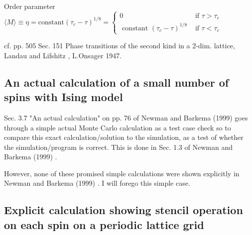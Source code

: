 \documentclass[10pt]{amsart}
\begin{document}
\begin{multicols*}{2}
Order parameter $\langle M \rangle \equiv \eta = \text{constant}(\tau_c - \tau)^{1/8} = \begin{cases} 0 & \text{ if } \tau > \tau_c \\ 
\text{ constant } (\tau_c-\tau)^{1/8} & \text{ if } \tau < \tau_c \end{cases}$  

cf. pp. 505 Sec. 151 Phase transitions of the second kind in a 2-dim. lattice,  Landau and Lifshitz \cite{LaLi1980}, L.Onsager 1947.  

\subsection{An actual calculation of a small number of spins with Ising model}  

Sec. 3.7 "An actual calculation" on pp. 76 of Newman and Barkema (1999) \cite{NeBa1999}
goes through a simple actual Monte Carlo calculation as a test case check so to compare this exact calculation/solution to the simulation, as a test of whether the simulation/program is correct.  This is done in Sec. 1.3 of Newman and Barkema (1999) \cite{NeBa1999}.  

However, none of these promised simple calculations were shown explicitly in Newman and Barkema (1999) \cite{NeBa1999}.  I will forego this simple case.  

\subsection{Explicit calculation showing stencil operation on each spin on a periodic lattice grid}  


\end{multicols*}
\end{document}
